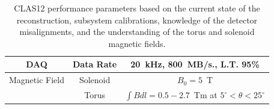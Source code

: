 \documentclass[final,3p,twocolumn]{elsarticle}
\begin{document}
\begin{table}[t!]
\begin{center}
\begin{tabular}{c|c|c}
DAQ &  Data Rate &  20~kHz,  800~MB/s., L.T. 95\%  \\ \hline 
Magnetic Field & Solenoid & $B_0 = 5$~T\\ \cline{2-3}
& Torus & $\int \!\!Bdl = 0.5-2.7$~Tm at $5^\circ < \theta < 25^\circ$\\ \hline 
\end{tabular}
\caption{CLAS12 performance parameters based on the current state of the reconstruction, subsystem calibrations,
  knowledge of the detector misalignments, and the understanding of the torus and solenoid magnetic fields.}    
\label{clas12-performance}
\end{center}
\end{table}

\clearpage

\vfil
\eject
\end{document}
